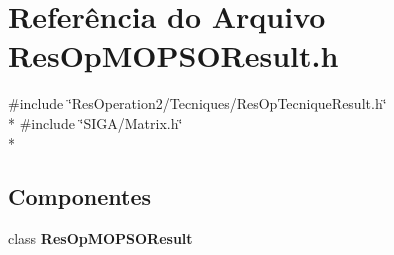 \section{Referência do Arquivo Res\+Op\+M\+O\+P\+S\+O\+Result.\+h}
\label{_2_tecniques_2_m_o_p_s_o_2_res_op_m_o_p_s_o_result_8h}
{\ttfamily \#include \char`\"{}Res\+Operation2/\+Tecniques/\+Res\+Op\+Tecnique\+Result.\+h\char`\"{}}\\*
{\ttfamily \#include \char`\"{}S\+I\+G\+A/\+Matrix.\+h\char`\"{}}\\*
\subsection*{Componentes}
\begin{DoxyCompactItemize}
\item 
class {\bf Res\+Op\+M\+O\+P\+S\+O\+Result}
\end{DoxyCompactItemize}
